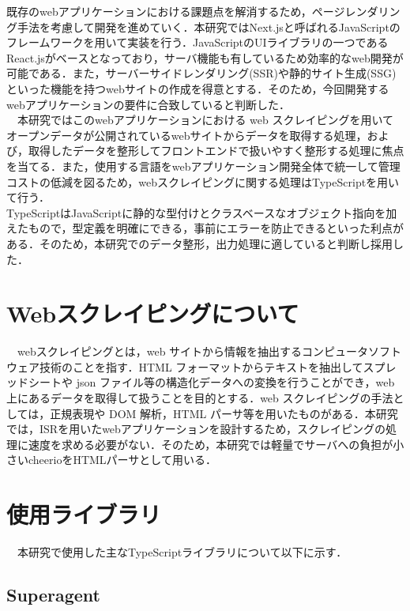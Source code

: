 既存のwebアプリケーションにおける課題点を解消するため，ページレンダリング手法を考慮して開発を進めていく．本研究ではNext.jsと呼ばれるJavaScriptのフレームワークを用いて実装を行う．JavaScriptのUIライブラリの一つであるReact.jsがベースとなっており，サーバ機能も有しているため効率的なweb開発が可能である．また，サーバーサイドレンダリング(SSR)や静的サイト生成(SSG)といった機能を持つwebサイトの作成を得意とする．そのため，今回開発するwebアプリケーションの要件に合致していると判断した．\cite{next}\\
　本研究ではこのwebアプリケーションにおける web スクレイピングを用いてオープンデータが公開されているwebサイトからデータを取得する処理，および，取得したデータを整形してフロントエンドで扱いやすく整形する処理に焦点を当てる．また，使用する言語をwebアプリケーション開発全体で統一して管理コストの低減を図るため，webスクレイピングに関する処理はTypeScriptを用いて行う．\\
 TypeScriptはJavaScriptに静的な型付けとクラスベースなオブジェクト指向を加えたもので，型定義を明確にできる，事前にエラーを防止できるといった利点がある．そのため，本研究でのデータ整形，出力処理に適していると判断し採用した．

\section{Webスクレイピングについて}

　webスクレイピングとは，web サイトから情報を抽出するコンピュータソフトウェア技術のことを指す．HTML フォーマットからテキストを抽出してスプレッドシートや json ファイル等の構造化データへの変換を行うことができ，web 上にあるデータを取得して扱うことを目的とする．web スクレイピングの手法としては，正規表現や DOM 解析，HTML パーサ等を用いたものがある．本研究では，ISRを用いたwebアプリケーションを設計するため，スクレイピングの処理に速度を求める必要がない．そのため，本研究では軽量でサーバへの負担が小さいcheerioをHTMLパーサとして用いる．
\section{使用ライブラリ}
　本研究で使用した主なTypeScriptライブラリについて以下に示す．
\subsection{Superagent}

